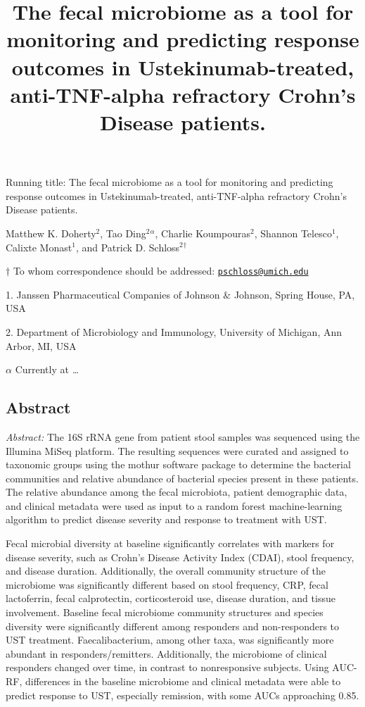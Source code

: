\documentclass[11pt,]{article}
\title{The fecal microbiome as a tool for monitoring and predicting response
outcomes in Ustekinumab-treated, anti-TNF-alpha refractory Crohn's
Disease patients.}
\author{}
\date{}
\begin{document}
\maketitle

\vspace{35mm}

Running title: The fecal microbiome as a tool for monitoring and
predicting response outcomes in Ustekinumab-treated, anti-TNF-alpha
refractory Crohn's Disease patients.

\vspace{35mm} Matthew K. Doherty\({^2}\), Tao Ding\({^2}\)\({^\alpha}\),
Charlie Koumpouras\({^2}\), Shannon Telesco\({^1}\), Calixte
Monast\({^1}\), and Patrick D. Schloss\({^2}\)\({^\dagger}\)

\(\dagger\) To whom correspondence should be addressed:
\href{mailto:pschloss@umich.edu}{\nolinkurl{pschloss@umich.edu}}

1. Janssen Pharmaceutical Companies of Johnson \({\&}\) Johnson, Spring
House, PA, USA

2. Department of Microbiology and Immunology, University of Michigan,
Ann Arbor, MI, USA

\({\alpha}\) Currently at \emph{\ldots{}}

\newpage

\subsection{Abstract}\label{abstract}

\emph{Abstract:} The 16S rRNA gene from patient stool samples was
sequenced using the Illumina MiSeq platform. The resulting sequences
were curated and assigned to taxonomic groups using the mothur software
package to determine the bacterial communities and relative abundance of
bacterial species present in these patients. The relative abundance
among the fecal microbiota, patient demographic data, and clinical
metadata were used as input to a random forest machine-learning
algorithm to predict disease severity and response to treatment with
UST.

Fecal microbial diversity at baseline significantly correlates with
markers for disease severity, such as Crohn's Disease Activity Index
(CDAI), stool frequency, and disease duration. Additionally, the overall
community structure of the microbiome was significantly different based
on stool frequency, CRP, fecal lactoferrin, fecal calprotectin,
corticosteroid use, disease duration, and tissue involvement. Baseline
fecal microbiome community structures and species diversity were
significantly different among responders and non-responders to UST
treatment. Faecalibacterium, among other taxa, was significantly more
abundant in responders/remitters. Additionally, the microbiome of
clinical responders changed over time, in contrast to nonresponsive
subjects. Using AUC-RF, differences in the baseline microbiome and
clinical metadata were able to predict response to UST, especially
remission, with some AUCs approaching 0.85.
\end{document}
